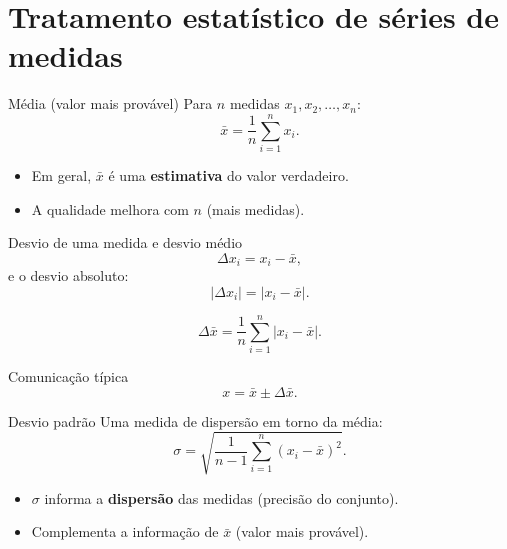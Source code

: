 \documentclass[aspectratio=169,10pt]{beamer}
\newcommand{\abs}[1]{\left|#1\right|}
\begin{document}
\section{Tratamento estatístico de séries de medidas}

\begin{frame}{Média (valor mais provável)}
Para \(n\) medidas \(x_1,x_2,\ldots,x_n\):
\begin{equation}
\label{eq:media}
\bar{x} = \frac{1}{n}\sum_{i=1}^{n} x_i.
\end{equation}

\begin{itemize}
  \item Em geral, \(\bar{x}\) é uma \textbf{estimativa} do valor verdadeiro.
  \item A qualidade melhora com \(n\) (mais medidas).
\end{itemize}
\end{frame}

\begin{frame}{Desvio de uma medida e desvio médio}
\begin{equation}
\label{eq:desvio_i}
\Delta x_i = x_i - \bar{x},
\end{equation}
e o desvio absoluto:
\begin{equation}
\label{eq:desvio_abs_i}
\abs{\Delta x_i} = \abs{x_i - \bar{x}}.
\end{equation}

\begin{equation}
\label{eq:desvio_medio}
\Delta \bar{x} = \frac{1}{n}\sum_{i=1}^{n}\abs{x_i - \bar{x}}.
\end{equation}

\begin{block}{Comunicação típica}
\[
x = \bar{x} \pm \Delta \bar{x}.
\]
\end{block}
\end{frame}

\begin{frame}{Desvio padrão}
Uma medida de dispersão em torno da média:
\begin{equation}
\label{eq:desvio_padrao}
\sigma = \sqrt{\frac{1}{n-1}\sum_{i=1}^{n}(x_i-\bar{x})^2}.
\end{equation}

\begin{itemize}
  \item \(\sigma\) informa a \textbf{dispersão} das medidas (precisão do conjunto).
  \item Complementa a informação de \(\bar{x}\) (valor mais provável).
\end{itemize}
\end{frame}
\end{document}
